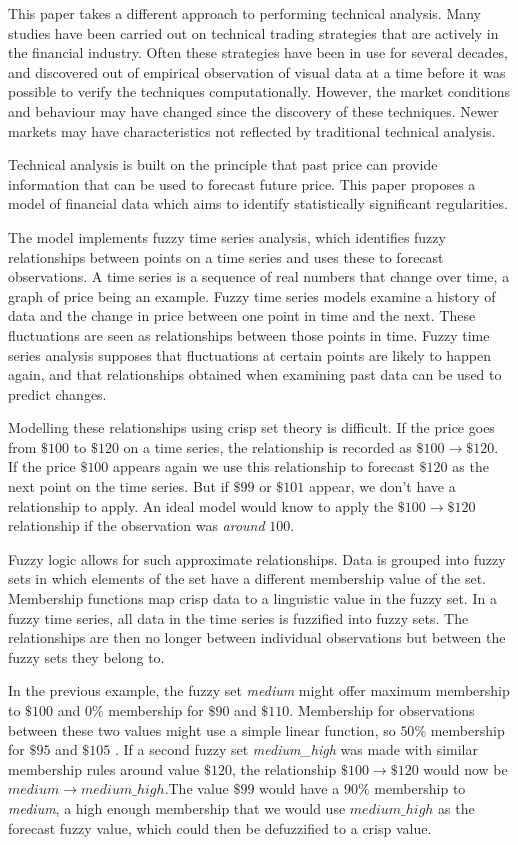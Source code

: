 \documentclass{article}
\theoremstyle{definition}
\begin{document}
This paper takes a different approach to performing technical analysis. Many studies have been carried out on technical trading strategies that are actively in the financial industry. Often these strategies have been in use for several decades, and discovered out of empirical observation of visual data at a time before it was possible to verify the techniques computationally. However, the market conditions and behaviour may have changed since the discovery of these techniques. Newer markets may have characteristics not reflected by traditional technical analysis.

Technical analysis is built on the principle that past price can provide information that can be used to forecast future price. This paper proposes a model of financial data which aims to identify statistically significant regularities. 

The model implements fuzzy time series analysis, which identifies fuzzy relationships between points on a time series and uses these to forecast observations. A time series is a sequence of real numbers that change over time, a graph of price being an example. Fuzzy time series models examine a history of data and the change in price between one point in time and the next. These fluctuations are seen as relationships between those points in time. Fuzzy time series analysis supposes that fluctuations at certain points are likely to happen again, and that relationships obtained when examining past data can be used to predict changes.

Modelling these relationships using crisp set theory is difficult. If the price goes from $\$100$ to $\$120$ on a time series, the relationship is recorded as $\$100 \rightarrow \$120$. If the price $\$100$ appears again we use this relationship to forecast $\$120$ as the next point on the time series. But if $\$99$ or $\$101$ appear, we don't have a relationship to apply. An ideal model would know to apply the $\$100 \rightarrow \$120$ relationship if the observation was \textit{around} $100$.

Fuzzy logic allows for such approximate relationships. Data is grouped into fuzzy sets in which elements of the set have a different membership value of the set. Membership functions map crisp data to a linguistic value in the fuzzy set. In a fuzzy time series, all data in the time series is fuzzified into fuzzy sets. The relationships are then no longer between individual observations but between the fuzzy sets they belong to.

In the previous example, the fuzzy set \textit{medium} might offer maximum membership to $\$100$ and $0\%$ membership for $\$90$ and $\$110$. Membership for observations between these two values might use a simple linear function, so $50\%$ membership for $\$95$ and $\$105$ . If a second fuzzy set \textit{medium\_high} was made with similar membership rules around value $\$120$, the relationship $\$100 \rightarrow \$120$ would now be $medium \rightarrow medium\_high$.The value $\$99$ would have a $90\%$ membership to \textit{medium}, a high enough membership that we would use $medium\_high$ as the forecast fuzzy value, which could then be defuzzified to a crisp value.
\end{document}
